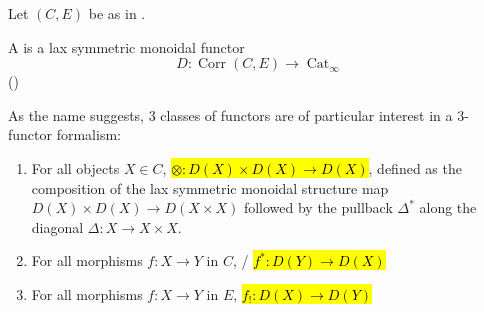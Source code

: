 \begin{definition} \label{definition:three_functor_formalism_for_an_infty_category_with_finite_limtis_and_class_of_morphisms_containing_isomorphisms_and_stable_under_pulback_and_composition}
    Let $(C,E)$ be as in . 

    A  is a lax symmetric monoidal functor
    $$D: \operatorname{Corr}(C,E) \to \operatorname{Cat}_\infty$$
    ()

    As the name suggests, $3$ classes of functors are of particular interest in a $3$-functor formalism:
    \begin{enumerate}
        \item For all objects $X \in C$,  \hl{$\otimes: D(X) \times D(X) \to D(X)$}, defined as the composition of the lax symmetric monoidal structure map $D(X) \times D(X) \to D(X \times X)$ followed by the pullback $\Delta^*$ along the diagonal $\Delta: X \to X \times X$.
        \item For all morphisms $f: X \to Y$ in $C$, / \hl{$f^*: D(Y) \to D(X)$}
        \item For all morphisms $f: X \to Y$ in $E$,  \hl{$f_!: D(X) \to D(Y)$}
    \end{enumerate}
\end{definition}